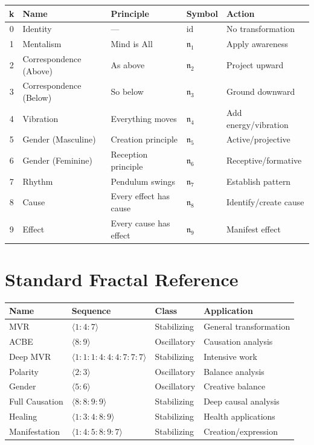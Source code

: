 \documentclass[11pt,twoside,openright]{book}
\theoremstyle{definition}
\theoremstyle{plain}
\theoremstyle{remark}
\newcommand{\id}{\mathrm{id}}
\begin{document}
\begin{center}
\begin{tabular}{cllll}
\toprule
\textbf{k} & \textbf{Name} & \textbf{Principle} & \textbf{Symbol} & \textbf{Action} \\
\midrule
0 & Identity & — & $\id$ & No transformation \\
1 & Mentalism & Mind is All & $\mathfrak{n}_1$ & Apply awareness \\
2 & Correspondence (Above) & As above & $\mathfrak{n}_2$ & Project upward \\
3 & Correspondence (Below) & So below & $\mathfrak{n}_3$ & Ground downward \\
4 & Vibration & Everything moves & $\mathfrak{n}_4$ & Add energy/vibration \\
5 & Gender (Masculine) & Creation principle & $\mathfrak{n}_5$ & Active/projective \\
6 & Gender (Feminine) & Reception principle & $\mathfrak{n}_6$ & Receptive/formative \\
7 & Rhythm & Pendulum swings & $\mathfrak{n}_7$ & Establish pattern \\
8 & Cause & Every effect has cause & $\mathfrak{n}_8$ & Identify/create cause \\
9 & Effect & Every cause has effect & $\mathfrak{n}_9$ & Manifest effect \\
\bottomrule
\end{tabular}
\end{center}

\section{Standard Fractal Reference}

\begin{center}
\begin{tabular}{llll}
\toprule
\textbf{Name} & \textbf{Sequence} & \textbf{Class} & \textbf{Application} \\
\midrule
MVR & $\langle 1:4:7 \rangle$ & Stabilizing & General transformation \\
ACBE & $\langle 8:9 \rangle$ & Oscillatory & Causation analysis \\
Deep MVR & $\langle 1:1:1:4:4:4:7:7:7 \rangle$ & Stabilizing & Intensive work \\
Polarity & $\langle 2:3 \rangle$ & Oscillatory & Balance analysis \\
Gender & $\langle 5:6 \rangle$ & Oscillatory & Creative balance \\
Full Causation & $\langle 8:8:9:9 \rangle$ & Stabilizing & Deep causal analysis \\
Healing & $\langle 1:3:4:8:9 \rangle$ & Stabilizing & Health applications \\
Manifestation & $\langle 1:4:5:8:9:7 \rangle$ & Stabilizing & Creation/expression \\
\bottomrule
\end{tabular}
\end{center}
\end{document}
